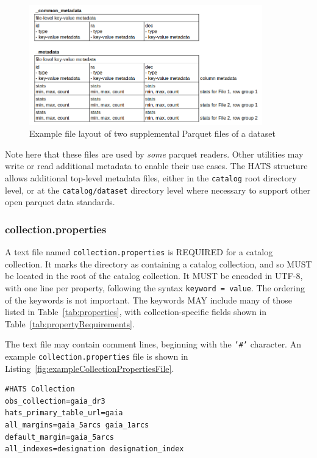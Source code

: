 \documentclass[11pt,a4paper]{ivoa}
\begin{document}
\begin{figure}
\centering
\includegraphics[width=0.9\textwidth]{metadata_files.png}
\caption{Example file layout of two supplemental Parquet files of a dataset}
\label{fig:parquetMetadata}
\end{figure}

Note here that these files are used by \textit{some} parquet readers. Other utilities may write or read 
additional metadata to enable their use cases. The HATS structure allows additional top-level metadata files,
either in the \texttt{catalog} root directory level, or at the \texttt{catalog/dataset} directory
level where necessary to support other open parquet data standards.

\subsubsection{collection.properties}\label{sec:collectionProperties}
A text file named \texttt{collection.properties} is REQUIRED for a catalog collection.
It marks the directory as containing a catalog collection, and so MUST be located in the 
root of the catalog collection.
It MUST be encoded in UTF-8, with one line per property, following the syntax \texttt{keyword = value}.
The ordering of the keywords is not important. 
The keywords MAY include many of those listed in Table~\ref{tab:properties}, with collection-specific fields shown in Table~\ref{tab:propertyRequirements}.

The text file may contain comment lines, beginning with the \texttt{'\#'} character.
An example \texttt{collection.properties} file is shown in Listing~\ref{fig:exampleCollectionPropertiesFile}.

\begin{minipage}{\linewidth}
\begin{lstlisting}[caption=Example \texttt{collection.properties} file contents, label=fig:exampleCollectionPropertiesFile]
#HATS Collection
obs_collection=gaia_dr3
hats_primary_table_url=gaia
all_margins=gaia_5arcs gaia_1arcs
default_margin=gaia_5arcs
all_indexes=designation designation_index
\end{lstlisting}
\end{minipage}
\end{document}

